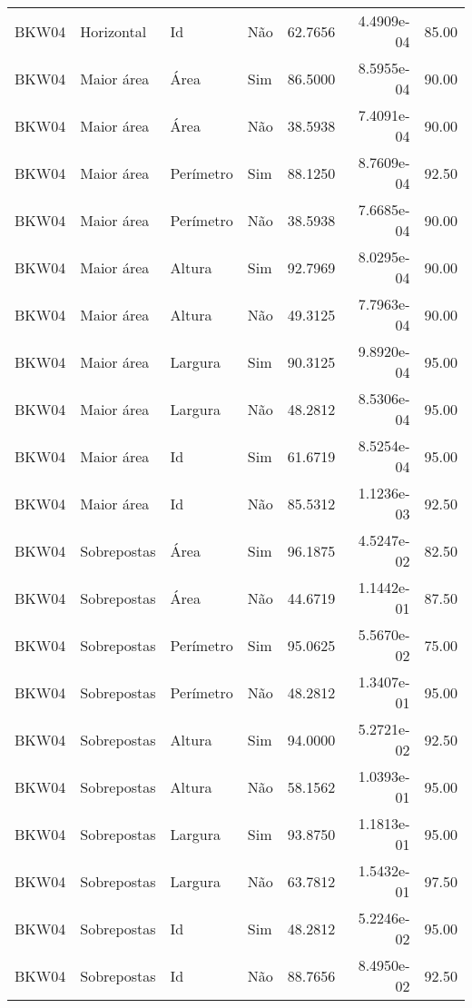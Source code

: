 \begin{tabular}{llllrrr}
BKW04     & Horizontal  & Id        & Não         & 62.7656      & 4.4909e-04 & 85.00    \\
BKW04     & Maior área  & Área      & Sim         & 86.5000      & 8.5955e-04 & 90.00    \\
BKW04     & Maior área  & Área      & Não         & 38.5938      & 7.4091e-04 & 90.00    \\
BKW04     & Maior área  & Perímetro & Sim         & 88.1250      & 8.7609e-04 & 92.50    \\
BKW04     & Maior área  & Perímetro & Não         & 38.5938      & 7.6685e-04 & 90.00    \\
BKW04     & Maior área  & Altura    & Sim         & 92.7969      & 8.0295e-04 & 90.00    \\
BKW04     & Maior área  & Altura    & Não         & 49.3125      & 7.7963e-04 & 90.00    \\
BKW04     & Maior área  & Largura   & Sim         & 90.3125      & 9.8920e-04 & 95.00    \\
BKW04     & Maior área  & Largura   & Não         & 48.2812      & 8.5306e-04 & 95.00    \\
BKW04     & Maior área  & Id        & Sim         & 61.6719      & 8.5254e-04 & 95.00    \\
BKW04     & Maior área  & Id        & Não         & 85.5312      & 1.1236e-03 & 92.50    \\
BKW04     & Sobrepostas & Área      & Sim         & 96.1875      & 4.5247e-02 & 82.50    \\
BKW04     & Sobrepostas & Área      & Não         & 44.6719      & 1.1442e-01 & 87.50    \\
BKW04     & Sobrepostas & Perímetro & Sim         & 95.0625      & 5.5670e-02 & 75.00    \\
BKW04     & Sobrepostas & Perímetro & Não         & 48.2812      & 1.3407e-01 & 95.00    \\
BKW04     & Sobrepostas & Altura    & Sim         & 94.0000      & 5.2721e-02 & 92.50    \\
BKW04     & Sobrepostas & Altura    & Não         & 58.1562      & 1.0393e-01 & 95.00    \\
BKW04     & Sobrepostas & Largura   & Sim         & 93.8750      & 1.1813e-01 & 95.00    \\
BKW04     & Sobrepostas & Largura   & Não         & 63.7812      & 1.5432e-01 & 97.50    \\
BKW04     & Sobrepostas & Id        & Sim         & 48.2812      & 5.2246e-02 & 95.00    \\
BKW04     & Sobrepostas & Id        & Não         & 88.7656      & 8.4950e-02 & 92.50    \\
\hline
\end{tabular}